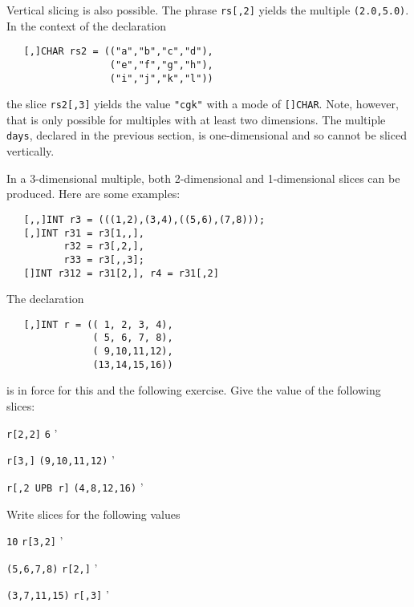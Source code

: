 Vertical slicing is also possible. The phrase \verb|rs[,2]| yields
the multiple \verb|(2.0,5.0)|. In the context of the declaration
\begin{verbatim}
   [,]CHAR rs2 = (("a","b","c","d"),
                  ("e","f","g","h"),
                  ("i","j","k","l"))
\end{verbatim}
\noindent
the slice \verb|rs2[,3]| yields the value \verb|"cgk"| with a mode of
\verb|[]CHAR|. Note, however, that  is only
possible for multiples with at least two dimensions.  The multiple
\verb|days|, declared in the previous section, is one-dimensional and
so cannot be sliced vertically.

In a 3-dimensional multiple, both 2-dimensional and 1-dimensional
slices can be produced. Here are some examples:
\begin{verbatim}
   [,,]INT r3 = (((1,2),(3,4),((5,6),(7,8)));
   [,]INT r31 = r3[1,,],
          r32 = r3[,2,],
          r33 = r3[,,3];
   []INT r312 = r31[2,], r4 = r31[,2]
\end{verbatim}

\begin{exercise}
\item The declaration
\begin{verbatim}
   [,]INT r = (( 1, 2, 3, 4),
               ( 5, 6, 7, 8),
               ( 9,10,11,12),
               (13,14,15,16))
\end{verbatim}
\noindent
is in force for this and the following exercise.  Give the value of
the following slices:
\begin{subex}
\item \verb|r[2,2]| \subans \verb|6|
'
\item \verb|r[3,]| \subans \verb|(9,10,11,12)|
'
\item \verb|r[,2 UPB r]| \subans \verb|(4,8,12,16)|
'
\end{subex}
\item Write slices for the following values
\begin{subex}
\item \verb|10| \subans \verb|r[3,2]|
'
\item \verb|(5,6,7,8)| \subans \verb|r[2,]|
'
\item \verb|(3,7,11,15)| \subans \verb|r[,3]|
'
\end{subex}
\end{exercise}

